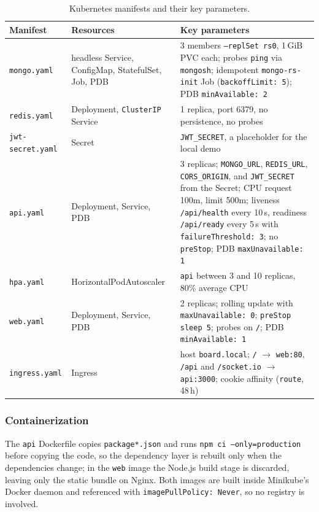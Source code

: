 \documentclass{scrartcl}
\begin{document}
\begin{table}[tbp]
  \centering
  \small
  \begin{tabular}{p{}p{}p{}}
    \hline
    \textbf{Manifest} & \textbf{Resources} & \textbf{Key parameters} \\
    \hline
    \texttt{mongo.yaml} & headless Service, ConfigMap, StatefulSet, Job, PDB & 3 members \texttt{--replSet rs0}, 1\,GiB PVC each; probes \texttt{ping} via \texttt{mongosh}; idempotent \texttt{mongo-rs-init} Job (\texttt{backoffLimit: 5}); PDB \texttt{minAvailable: 2} \\
    \texttt{redis.yaml} & Deployment, \texttt{ClusterIP} Service & 1 replica, port 6379, no persistence, no probes \\
    \texttt{jwt-secret.yaml} & Secret & \texttt{JWT\_SECRET}, a placeholder for the local demo \\
    \texttt{api.yaml} & Deployment, Service, PDB & 3 replicas; \texttt{MONGO\_URL}, \texttt{REDIS\_URL}, \texttt{CORS\_ORIGIN}, and \texttt{JWT\_SECRET} from the Secret; CPU request 100m, limit 500m; liveness \texttt{/api/health} every 10\,s, readiness \texttt{/api/ready} every 5\,s with \texttt{failureThreshold: 3}; no \texttt{preStop}; PDB \texttt{maxUnavailable: 1} \\
    \texttt{hpa.yaml} & HorizontalPodAutoscaler & \texttt{api} between 3 and 10 replicas, 80\% average CPU \\
    \texttt{web.yaml} & Deployment, Service, PDB & 2 replicas; rolling update with \texttt{maxUnavailable: 0}; \texttt{preStop} \texttt{sleep 5}; probes on \texttt{/}; PDB \texttt{minAvailable: 1} \\
    \texttt{ingress.yaml} & Ingress & host \texttt{board.local}; \texttt{/} $\to$ \texttt{web:80}, \texttt{/api} and \texttt{/socket.io} $\to$ \texttt{api:3000}; cookie affinity (\texttt{route}, 48\,h) \\
    \hline
  \end{tabular}
  \caption{Kubernetes manifests and their key parameters.}
  \label{tab:manifests}
\end{table}

\subsubsection{Containerization}

The \texttt{api} Dockerfile copies \texttt{package*.json} and runs \texttt{npm ci --only=production} before copying the code, so the dependency layer is rebuilt only when the dependencies change; in the \texttt{web} image the Node.js build stage is discarded, leaving only the static bundle on Nginx. Both images are built inside Minikube's Docker daemon and referenced with \texttt{imagePullPolicy: Never}, so no registry is involved.
\end{document}
